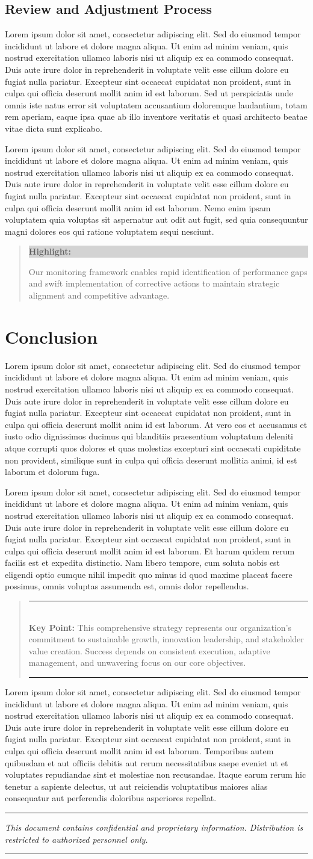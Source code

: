\documentclass[11pt,a4paper]{article}
\newcommand{\loremtext}[1]{%
  Lorem ipsum dolor sit amet, consectetur adipiscing elit. Sed do eiusmod tempor incididunt ut labore et dolore magna aliqua. Ut enim ad minim veniam, quis nostrud exercitation ullamco laboris nisi ut aliquip ex ea commodo consequat. Duis aute irure dolor in reprehenderit in voluptate velit esse cillum dolore eu fugiat nulla pariatur. Excepteur sint occaecat cupidatat non proident, sunt in culpa qui officia deserunt mollit anim id est laborum.%
}
\newenvironment{keypoint}%
{\begin{quote}\textcolor{accent}{\rule{\textwidth}{2pt}}\vspace{0.2em}\\\textbf{Key Point:} }%
{\vspace{0.2em}\\\textcolor{accent}{\rule{\textwidth}{2pt}}\end{quote}}
\newenvironment{highlight}%
{\begin{quote}\colorbox{lightgray}{\parbox{\dimexpr\linewidth-2\fboxsep}{\textbf{Highlight:} }}}%
{\end{quote}}
\begin{document}
\subsection{Review and Adjustment Process}

\loremtext{16} Sed ut perspiciatis unde omnis iste natus error sit voluptatem accusantium doloremque laudantium, totam rem aperiam, eaque ipsa quae ab illo inventore veritatis et quasi architecto beatae vitae dicta sunt explicabo.

\loremtext{17} Nemo enim ipsam voluptatem quia voluptas sit aspernatur aut odit aut fugit, sed quia consequuntur magni dolores eos qui ratione voluptatem sequi nesciunt.

\begin{highlight}
Our monitoring framework enables rapid identification of performance gaps and swift implementation of corrective actions to maintain strategic alignment and competitive advantage.
\end{highlight}

\section{Conclusion}

\loremtext{18} At vero eos et accusamus et iusto odio dignissimos ducimus qui blanditiis praesentium voluptatum deleniti atque corrupti quos dolores et quas molestias excepturi sint occaecati cupiditate non provident, similique sunt in culpa qui officia deserunt mollitia animi, id est laborum et dolorum fuga.

\loremtext{19} Et harum quidem rerum facilis est et expedita distinctio. Nam libero tempore, cum soluta nobis est eligendi optio cumque nihil impedit quo minus id quod maxime placeat facere possimus, omnis voluptas assumenda est, omnis dolor repellendus.

\begin{keypoint}
This comprehensive strategy represents our organization's commitment to sustainable growth, innovation leadership, and stakeholder value creation. Success depends on consistent execution, adaptive management, and unwavering focus on our core objectives.
\end{keypoint}

\loremtext{20} Temporibus autem quibusdam et aut officiis debitis aut rerum necessitatibus saepe eveniet ut et voluptates repudiandae sint et molestiae non recusandae. Itaque earum rerum hic tenetur a sapiente delectus, ut aut reiciendis voluptatibus maiores alias consequatur aut perferendis doloribus asperiores repellat.

\vspace{2cm}
\begin{center}
\textcolor{secondary}{\rule{0.5\textwidth}{0.5pt}}

\textcolor{secondary}{\textit{This document contains confidential and proprietary information. Distribution is restricted to authorized personnel only.}}

\textcolor{secondary}{\rule{0.5\textwidth}{0.5pt}}
\end{center}
\end{document}
